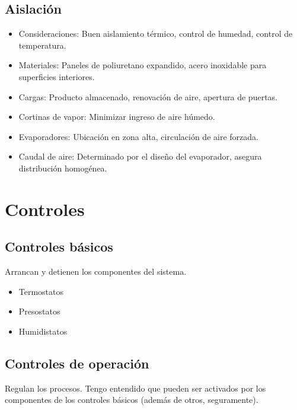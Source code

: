 \subsection{Aislación}

\begin{itemize}
\item Consideraciones: Buen aislamiento térmico, control de humedad, control de temperatura.
\item Materiales: Paneles de poliuretano expandido, acero inoxidable para superficies interiores.
\item Cargas: Producto almacenado, renovación de aire, apertura de puertas.
\item Cortinas de vapor: Minimizar ingreso de aire húmedo.
\item Evaporadores: Ubicación en zona alta, circulación de aire forzada.
\item Caudal de aire: Determinado por el diseño del evaporador, asegura distribución homogénea.
\end{itemize}

\section{Controles}

\subsection{Controles básicos}
Arrancan y detienen los componentes del sistema.
\begin{itemize}
    \item Termostatos
    \item Presostatos
    \item Humidistatos
\end{itemize}

\subsection{Controles de operación}
Regulan los procesos. Tengo entendido que pueden ser activados por los componentes de los controles básicos (además de otros, seguramente).

